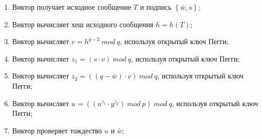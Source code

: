 \begin{enumerate}

\item Виктор получает исходное сообщение $T$ и подпись $\left\{\bar{w}, s\right\}$;
\item Виктор вычисляет хеш исходного сообщения $h = h(T)$;
\item Виктор вычисляет $v = h^{q-2} \ mod \ q$, используя открытый ключ Пегги;
\item Виктор вычисляет $z_1 = (s \cdot v) \ mod \ q$, используя открытый ключ Пегги;
\item Виктор вычисляет $z_2 = ((q - \bar{w}) \cdot v) \ mod \ q$, используя открытый ключ Пегги;
\item Виктор вычисляет $u = ((a^{z_1} \cdot y^{z_2}) \ mod \ p) \ mod \ q$, используя открытый ключ Пегги;
\item Виктор проверяет тождество $u$ и $\bar{w}$;

\end{enumerate}
